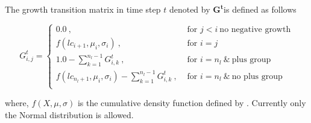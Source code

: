 The growth transition matrix in time step \(t\) denoted by \(\mathbf{G^t}\)is defined as follows

\begin{equation}
G^t_{i,j} = 
\begin{cases}
0.0 \ , & \text{ for } j < i \ \text{no negative growth}\\
f(lc_{i + 1},\mu_i, \sigma_i) \ , & \text{ for } i = j \\
1.0 - \sum\limits_{k = 1}^{n_l - 1}G^t_{i,k} \ , & \text{ for } i = n_l \ \& \ \text{plus group} \\
f(lc_{n_l + 1},\mu_i, \sigma_i) - \sum\limits_{k = 1}^{n_l - 1}G^t_{i,k} \ , & \text{ for } i = n_l \ \&  \  \text{no plus group} \\		
\end{cases}
\end{equation}

where, \(f(X,\mu, \sigma)\) is the cumulative density function defined by . Currently only the Normal distribution is allowed.

